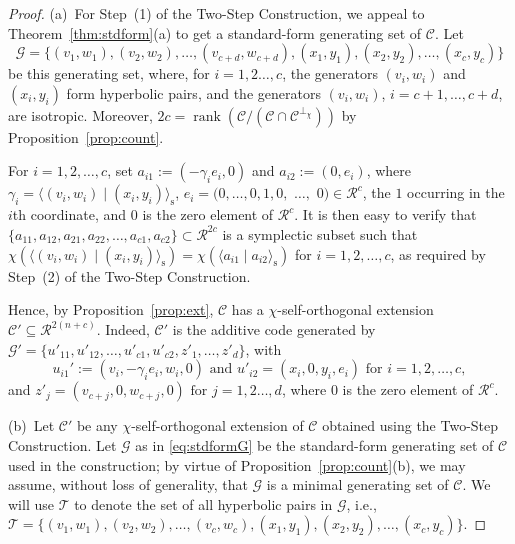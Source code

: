 \documentclass{article}
\DeclareMathOperator{\rank}{rank}
\theoremstyle{remark}
\theoremstyle{definition}
\numberwithin{equation}{section}
\begin{document}
\begin{proof}
(a)\ For Step~(1) of the Two-Step Construction, we appeal to Theorem~\ref{thm:stdform}(a) to get a standard-form generating set of $\mathcal{C}$. Let 
\begin{equation}
\mathcal{G}=\{(v_1,w_1),(v_2,w_2),\ldots, (v_{c+d},w_{c+d}),(x_1,y_1),(x_2,y_2),\ldots, (x_{c},y_{c})\}
\label{eq:stdformG}
\end{equation}
be this generating set, where, for $i = 1,2\ldots,c$, the generators $(v_i,w_i)$ and $(x_i,y_i)$ form hyperbolic pairs, and the generators $(v_i,w_i)$, $i = c+1,\ldots,c+d$, are isotropic. Moreover, $2c = \rank(\mathcal{C}/(\mathcal{C} \cap \mathcal{C}^{\perp_\chi}))$ by Proposition~\ref{prop:count}. 

For $i = 1,2,\ldots,c$, set $a_{i1} := (-\gamma_i e_i,0)$ and $a_{i2} := (0,e_i)$, where $\gamma_i = \langle(v_i,w_i) \mid (x_i,y_i)\rangle_{\mathrm{s}}$, $e_i = (0,\ldots,0,1,0,$ $\ldots,$ $0) \in \mathcal{R}^c$, the $1$ occurring in the $i$th coordinate, and $0$ is the zero element of $\mathcal{R}^c$. It is then easy to verify that $\{a_{11},a_{12},a_{21},a_{22},\ldots,a_{c1},a_{c2}\} \subset \mathcal{R}^{2c}$ is a symplectic subset such that $\chi(\langle (v_i,w_i) \mid (x_i,y_i) \rangle_{\mathrm{s}}) = \chi(\langle a_{i1} \mid a_{i2} \rangle_{\mathrm{s}})$ for $i=1,2,\ldots,c$, as required by Step~(2) of the Two-Step Construction.

Hence, by Proposition~\ref{prop:ext}, $\mathcal{C}$ has a $\chi$-self-orthogonal extension $\mathcal{C}' \subseteq \mathcal{R}^{2(n+c)}$. Indeed, $\mathcal{C}'$ is the additive code generated by $\mathcal{G}' = \{u'_{11},u'_{12},\ldots,u'_{c1},u'_{c2},z'_1,\ldots,z'_d\}$, with 
$$
 u_{i1}' := (v_i,-\gamma_i e_i,w_i,0) \text{ and }  u'_{i2} = (x_i,0,y_i,e_i)  \text{ for } i = 1,2,\ldots,c,
 $$
 and  $z'_j = (v_{c+j},0,w_{c+j},0) \text{ for } j=1,2\ldots,d$, where $0$ is the zero element of $\mathcal{R}^c$. 

(b)\  Let $\mathcal{C}'$ be any $\chi$-self-orthogonal extension of $\mathcal{C}$ obtained using the Two-Step Construction. Let $\mathcal{G}$ as in \eqref{eq:stdformG} be the standard-form generating set of $\mathcal{C}$ used in the construction; by virtue of Proposition~\ref{prop:count}(b), we may assume, without loss of generality, that $\mathcal{G}$ is a minimal generating set of $\mathcal{C}$. We will use $\mathcal{T}$ to denote the set of all hyperbolic pairs in $\mathcal{G}$, i.e., $\mathcal{T} = \{(v_1,w_1),(v_2,w_2),\ldots, (v_{c},w_{c}),(x_1,y_1),(x_2,y_2),\ldots, (x_{c},y_{c})\}$.


\end{proof}
\end{document}
